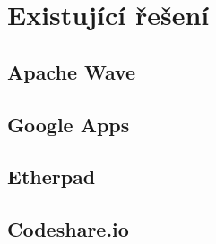 
\section{Existující řešení}
\subsection{Apache Wave}
\subsection{Google Apps}
\subsection{Etherpad}
\subsection{Codeshare.io}